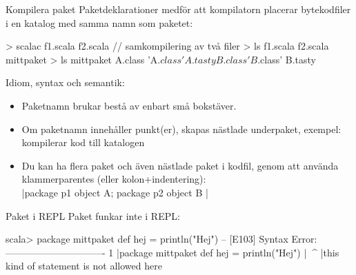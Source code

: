 \begin{Slide}{Kompilera paket}\SlideFontSmall
Paketdeklarationer medför att kompilatorn placerar bytekodfiler i en katalog med samma namn som paketet:
\begin{REPL}
> scalac f1.scala f2.scala     // samkompilering av två filer
> ls
f1.scala  f2.scala  mittpaket
> ls mittpaket
A.class  'A$.class'   A.tasty   
B.class  'B$.class'   B.tasty 
\end{REPL}
\pause
Idiom, syntax och semantik:
\begin{itemize}
  \item Paketnamn brukar bestå av enbart små bokstäver.
  \item Om paketnamn innehåller punkt(er), skapas nästlade underpaket, exempel:   kompilerar kod till katalogen 
  \item Du kan ha flera paket och även nästlade paket i  kodfil, genom att använda klammerparentes (eller kolon+indentering):\\
  \code|package p1 { object A; package p2 { object B }}|
\end{itemize}
\end{Slide}

\begin{Slide}{Paket i REPL}
Paket funkar inte i REPL:
\begin{REPLnonum}
scala> package mittpaket { def hej = println("Hej") }
-- [E103] Syntax Error: -------------------------------
1 |package mittpaket { def hej = println("Hej") }
  |^^^^^^^
  |this kind of statement is not allowed here

\end{REPLnonum}
\end{Slide}




